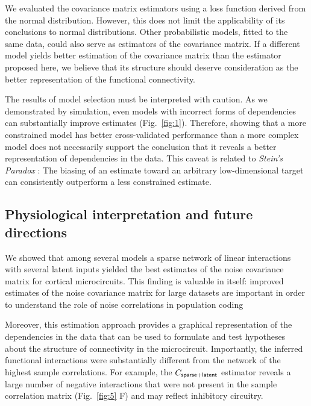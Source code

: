 We evaluated the covariance matrix estimators using a loss function derived from the normal distribution.  However, this does not limit the applicability of its conclusions to normal distributions. Other probabilistic models, fitted to the same data, could also serve as estimators of the covariance matrix.  If a different model yields better estimation of the covariance matrix than the estimator proposed here, we believe that its structure should deserve consideration as the better representation of the functional connectivity.

The results of model selection must be interpreted with caution.  As we demonstrated by simulation, even models with incorrect forms of dependencies can substantially improve estimates (Fig.~\ref{fig:1}). Therefore, showing that a more constrained model has better cross-validated performance than a more complex model does not necessarily support the conclusion that it reveals a better representation of dependencies in the data.  This caveat is related to \emph{Stein's Paradox} \cite{Efron:1977}: The biasing of an estimate toward an arbitrary low-dimensional target can consistently outperform a less constrained estimate.

\subsection*{Physiological interpretation and future directions}

We showed that among several models a sparse network of linear interactions with several latent inputs yielded the best estimates of the noise covariance matrix for cortical microcircuits.  This finding is valuable in itself: improved estimates of the noise covariance matrix for large datasets are important in order to understand the role of noise correlations in population coding \cite{Abbott:1999, Sompolinsky:2001, Averbeck:2006, Ecker:2011}

Moreover, this estimation approach provides a graphical representation of the dependencies in the data that can be used to formulate and test hypotheses about the structure of connectivity in the microcircuit. Importantly, the inferred functional interactions were substantially different from the network of the highest sample correlations.  For example, the $C_{\sf sparse+latent}$ estimator reveals a large number of negative interactions that were not present in the sample correlation matrix (Fig.~\ref{fig:5} F) and may reflect inhibitory circuitry.


